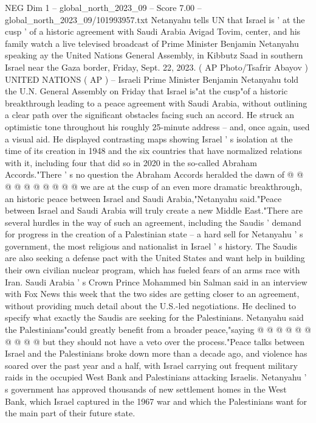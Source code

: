 \begin{textsample}{NEG Dim 1 – global\_north\_2023\_09 – Score 7.00 – global\_north\_2023\_09/101993957.txt}  \label{ex:f1_neg_097}
Netanyahu tells UN that Israel is ' at the cusp ' of a historic agreement with Saudi Arabia Avigad Tovim, center, and his family watch a live televised broadcast of Prime Minister Benjamin Netanyahu speaking ay the United Nations General Assembly, in Kibbutz Saad in southern Israel near the Gaza border, Friday, Sept. 22, 2023. ( AP Photo/Tsafrir Abayov ) UNITED NATIONS ( AP ) -- Israeli Prime Minister Benjamin Netanyahu told the U.N.
General Assembly on Friday that Israel is"at the cusp"of a historic breakthrough leading to a peace agreement with Saudi Arabia, without outlining a clear path over the significant obstacles facing such an accord.
He struck an optimistic tone throughout his roughly 25-minute address -- and, once again, used a visual aid.
He displayed contrasting maps showing Israel ' s isolation at the time of its creation in 1948 and the six countries that have normalized relations with it, including four that did so in 2020 in the so-called Abraham Accords."There ' s no question the Abraham Accords heralded the dawn of @ @ @ @ @ @ @ @ @ @ we are at the cusp of an even more dramatic breakthrough, an historic peace between Israel and Saudi Arabia,"Netanyahu said."Peace between Israel and Saudi Arabia will truly create a new Middle East."There are several hurdles in the way of such an agreement, including the Saudis ' demand for progress in the creation of a Palestinian state -- a hard sell for Netanyahu ' s government, the most religious and nationalist in Israel ' s history.
The Saudis are also seeking a defense pact with the United States and want help in building their own civilian nuclear program, which has fueled fears of an arms race with Iran.
Saudi Arabia ' s Crown Prince Mohammed bin Salman said in an interview with Fox News this week that the two sides are getting closer to an agreement, without providing much detail about the U.S.-led negotiations.
He declined to specify what exactly the Saudis are seeking for the Palestinians.
Netanyahu said the Palestinians"could greatly benefit from a broader peace,"saying @ @ @ @ @ @ @ @ @ @ but they should not have a veto over the process."Peace talks between Israel and the Palestinians broke down more than a decade ago, and violence has soared over the past year and a half, with Israel carrying out frequent military raids in the occupied West Bank and Palestinians attacking Israelis.
Netanyahu ' s government has approved thousands of new settlement homes in the West Bank, which Israel captured in the 1967 war and which the Palestinians want for the main part of their future state.

\end{textsample}
